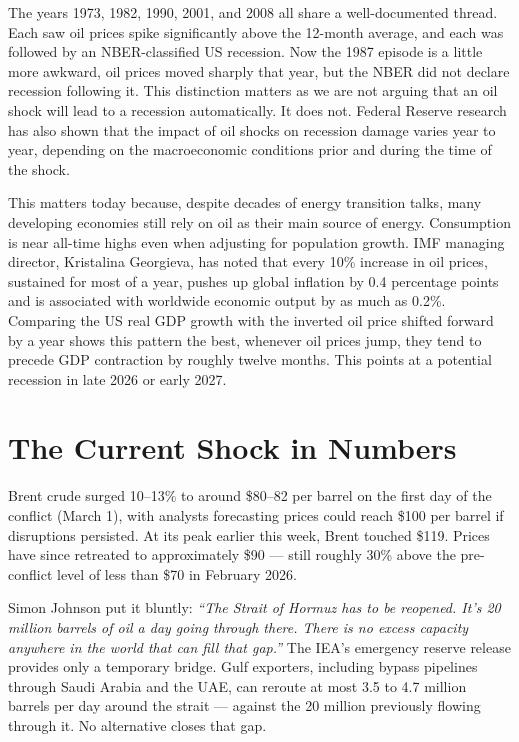 \documentclass[12pt,a4paper]{article}
\begin{document}
The years 1973, 1982, 1990, 2001, and 2008 all share a well-documented thread.  Each saw oil prices spike significantly above the 12-month average, and each was followed by an NBER-classified US recession. Now the 1987 episode is a little more awkward, oil prices moved sharply that year, but the NBER did not declare recession following it. This distinction matters as we are not arguing that an oil shock will lead to a recession automatically. It does not.  Federal Reserve research has also shown that the impact of oil shocks on recession damage varies year to year, depending on the macroeconomic conditions prior and during the time of the shock. 

This matters today because, despite decades of energy transition talks, many developing economies still rely on oil as their main source of energy. Consumption is near all-time highs even when adjusting for population growth. IMF managing director, Kristalina Georgieva, has noted that every 10\% increase in oil prices, sustained for most of a year, pushes up global inflation by 0.4 percentage points and is associated with worldwide economic output by as much as 0.2\%. Comparing the US real GDP growth with the inverted oil price shifted forward by a year shows this pattern the best, whenever oil prices jump, they tend to precede GDP contraction by roughly twelve months. This points at a potential recession in late 2026 or early 2027. 

\section{The Current Shock in Numbers}

Brent crude surged 10--13\% to around \$80--82 per barrel on the first day of the conflict (March 1), with analysts forecasting prices could reach \$100 per barrel if disruptions persisted. At its peak earlier this week, Brent touched \$119. Prices have since retreated to approximately \$90 --- still roughly 30\% above the pre-conflict level of less than \$70 in February 2026.

Simon Johnson put it bluntly: \textit{``The Strait of Hormuz has to be reopened. It's 20 million barrels of oil a day going through there. There is no excess capacity anywhere in the world that can fill that gap.''} The IEA's emergency reserve release provides only a temporary bridge. Gulf exporters, including bypass pipelines through Saudi Arabia and the UAE, can reroute at most 3.5 to 4.7 million barrels per day around the strait --- against the 20 million previously flowing through it. No alternative closes that gap.
\end{document}
